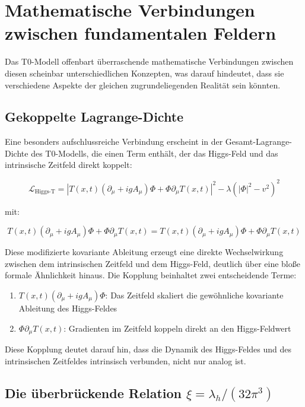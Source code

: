 \documentclass[12pt,a4paper]{article}
\newcommand{\Tfieldt}{T(x,t)}
\newcommand{\DhiggsTt}{\Tfieldt (\partial_\mu + ig A_\mu) \Phi + \Phi \partial_\mu \Tfieldt}
\begin{document}
	\section{Mathematische Verbindungen zwischen fundamentalen Feldern}
	\label{sec:mathematical_connections}
	
	Das T0-Modell offenbart überraschende mathematische Verbindungen zwischen diesen scheinbar unterschiedlichen Konzepten, was darauf hindeutet, dass sie verschiedene Aspekte der gleichen zugrundeliegenden Realität sein könnten.
	
	\subsection{Gekoppelte Lagrange-Dichte}
	\label{subsec:coupled_lagrangian}
	
	Eine besonders aufschlussreiche Verbindung erscheint in der Gesamt-Lagrange-Dichte des T0-Modells, die einen Term enthält, der das Higgs-Feld und das intrinsische Zeitfeld direkt koppelt:
	
	\begin{equation}
		\mathcal{L}_{\text{Higgs-T}} = |\DhiggsTt|^2 - \lambda(|\Phi|^2 - v^2)^2
	\end{equation}
	
	mit:
	
	\begin{equation}
		\DhiggsTt = \Tfieldt (\partial_\mu + ig A_\mu) \Phi + \Phi \partial_\mu \Tfieldt
	\end{equation}
	
	Diese modifizierte kovariante Ableitung erzeugt eine direkte Wechselwirkung zwischen dem intrinsischen Zeitfeld und dem Higgs-Feld, deutlich über eine bloße formale Ähnlichkeit hinaus. Die Kopplung beinhaltet zwei entscheidende Terme:
	
	\begin{enumerate}
		\item $\Tfieldt (\partial_\mu + ig A_\mu) \Phi$: Das Zeitfeld skaliert die gewöhnliche kovariante Ableitung des Higgs-Feldes
		\item $\Phi \partial_\mu \Tfieldt$: Gradienten im Zeitfeld koppeln direkt an den Higgs-Feldwert
	\end{enumerate}
	
	Diese Kopplung deutet darauf hin, dass die Dynamik des Higgs-Feldes und des intrinsischen Zeitfeldes intrinsisch verbunden, nicht nur analog ist.
	
	\subsection{Die überbrückende Relation $\xi = \lambda_h/(32\pi^3)$}
	\label{subsec:bridging_relation}
	
\end{document}
